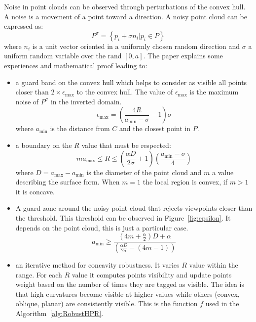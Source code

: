 Noise in point clouds can be observed through perturbations of the convex hull. A noise is a movement of a point toward a direction. A noisy point cloud can be expressed as:
\begin{equation*}
  P^\sigma = \left\lbrace p_i + \sigma n_i | p_i \in P  \right\rbrace
\end{equation*}
where $n_i$ is a unit vector oriented in a uniformly chosen random direction and $\sigma$ a uniform random variable over the rand $[0, a]$. The \cite{vis2} paper explains some experiences and mathematical proof leading to:
\begin{itemize}
  \item a guard band on the convex hull which helps to consider as visible all points closer than $2 \times \epsilon_{\text{max}}$ to the convex hull. The value of $\epsilon_\text{max}$ is the maximum noise of $P^\sigma$ in the inverted domain.
    \begin{equation*}
      \epsilon_\text{max} = \left( \frac{4R}{a_\text{min} - \sigma} - 1 \right) \sigma
    \end{equation*}
    where $a_\text{min}$ is the distance from $C$ and the closest point in $P$.
  \item a boundary on the $R$ value that must be respected:
    \begin{equation*}
      ma_{\text{max}} \leq R \leq \left( \frac{\alpha D}{2 \sigma} + 1 \right) \left( \frac{a_{\text{min}} - \sigma}{4} \right)
    \end{equation*}
    where $D = a_\text{max} - a_\text{min}$ is the diameter of the point cloud and $m$ a value describing the surface form. When $m = 1$ the local region is convex, if $m > 1$ it is concave.
  \item A guard zone around the noisy point cloud that rejects viewpoints closer than the threshold. This threshold can be observed in Figure~\ref{fig:epsilon}. It depends on the point cloud, this is just a particular case.
    \begin{equation*}
      a_\text{min} \geq \frac{\left(4m + \frac{\alpha}{2} \right) D + \alpha}{\left(\frac{\alpha D}{2 \sigma} - (4m - 1)\right)}
    \end{equation*}
  \item an iterative method for concavity robustness. It varies $R$ value within the range. For each $R$ value it computes points visibility and update points weight based on the number of times they are tagged as visible. The idea is that high curvatures become visible at higher values while others (convex, oblique, planar) are consistently visible. This is the function $f$ used in the Algorithm~\ref{alg:RobustHPR}.
\end{itemize}

